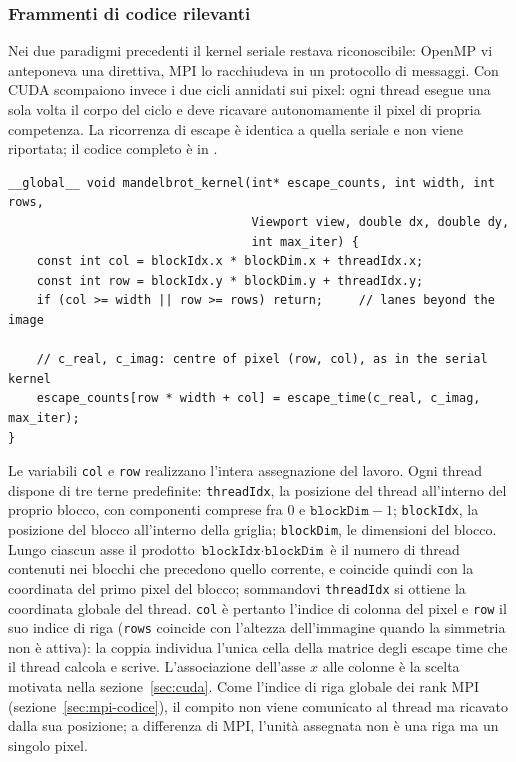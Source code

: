 \subsubsection{Frammenti di codice rilevanti}
\label{sec:cuda-codice}

Nei due paradigmi precedenti il kernel seriale restava riconoscibile: OpenMP vi
anteponeva una direttiva, MPI lo racchiudeva in un protocollo di messaggi. Con
CUDA scompaiono invece i due cicli annidati sui pixel: ogni thread esegue una
sola volta il corpo del ciclo e deve ricavare autonomamente il pixel di propria
competenza. La ricorrenza di escape è identica a quella seriale e non viene
riportata; il codice completo è in .

\begin{verbatim}
__global__ void mandelbrot_kernel(int* escape_counts, int width, int rows,
                                  Viewport view, double dx, double dy,
                                  int max_iter) {
    const int col = blockIdx.x * blockDim.x + threadIdx.x;
    const int row = blockIdx.y * blockDim.y + threadIdx.y;
    if (col >= width || row >= rows) return;     // lanes beyond the image

    // c_real, c_imag: centre of pixel (row, col), as in the serial kernel
    escape_counts[row * width + col] = escape_time(c_real, c_imag, max_iter);
}
\end{verbatim}

Le variabili \texttt{col} e \texttt{row} realizzano l'intera assegnazione del
lavoro. Ogni thread dispone di tre terne predefinite: \texttt{threadIdx}, la
posizione del thread all'interno del proprio blocco, con componenti comprese fra
$0$ e $\texttt{blockDim}-1$; \texttt{blockIdx}, la posizione del blocco
all'interno della griglia; \texttt{blockDim}, le dimensioni del blocco. Lungo
ciascun asse il prodotto $\texttt{blockIdx}\cdot\texttt{blockDim}$ è il numero di
thread contenuti nei blocchi che precedono quello corrente, e coincide quindi con
la coordinata del primo pixel del blocco; sommandovi \texttt{threadIdx} si ottiene
la coordinata globale del thread. \texttt{col} è pertanto l'indice di colonna del
pixel e \texttt{row} il suo indice di riga (\texttt{rows} coincide con l'altezza
dell'immagine quando la simmetria non è attiva): la coppia individua l'unica cella
della matrice degli escape time che il thread calcola e scrive. L'associazione
dell'asse $x$ alle colonne è la scelta motivata nella sezione~\ref{sec:cuda}. Come
l'indice di riga globale dei rank MPI (sezione~\ref{sec:mpi-codice}), il compito
non viene comunicato al thread ma ricavato dalla sua posizione; a differenza di
MPI, l'unità assegnata non è una riga ma un singolo pixel.

